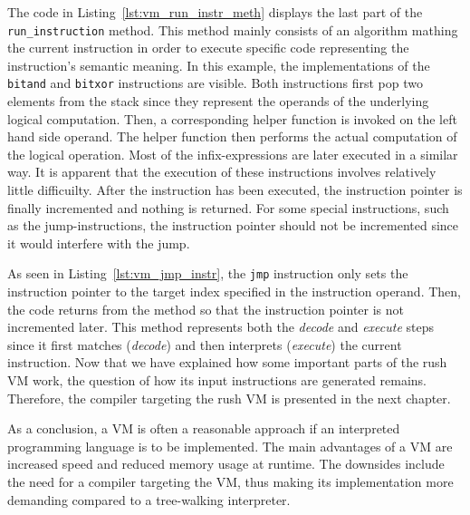 The code in Listing~\ref{lst:vm_run_instr_meth} displays the last part of the \texttt{run\_instruction} method.
This method mainly consists of an algorithm mathing the current instruction in order to execute specific code representing the instruction's semantic meaning.
In this example, the implementations of the \texttt{bitand} and \texttt{bitxor} instructions are visible.
Both instructions first pop two elements from the stack since they represent the operands of the underlying logical computation.
Then, a corresponding helper function is invoked on the left hand side operand.
The helper function then performs the actual computation of the logical operation.
Most of the infix-expressions are later executed in a similar way.
It is apparent that the execution of these instructions involves relatively little difficuilty.
After the instruction has been executed, the instruction pointer is finally incremented and nothing is returned.
For some special instructions, such as the jump-instructions, the instruction pointer should not be incremented since it would interfere with the jump.


As seen in Listing~\ref{lst:vm_jmp_instr}, the \texttt{jmp} instruction only sets the instruction pointer to the target index specified in the instruction operand.
Then, the code returns from the method so that the instruction pointer is not incremented later.
This method represents both the \emph{decode} and \emph{execute} steps since it first matches (\emph{decode}) and then interprets (\emph{execute}) the current instruction.
Now that we have explained how some important parts of the rush VM work,
the question of how its input instructions are generated remains.
Therefore, the compiler targeting the rush VM is presented in the next chapter.

As a conclusion, a VM is often a reasonable approach if an interpreted programming language is to be implemented.
The main advantages of a VM are increased speed and reduced memory usage at runtime.
The downsides include the need for a compiler targeting the VM, thus making its implementation more demanding compared to a tree-walking interpreter.
